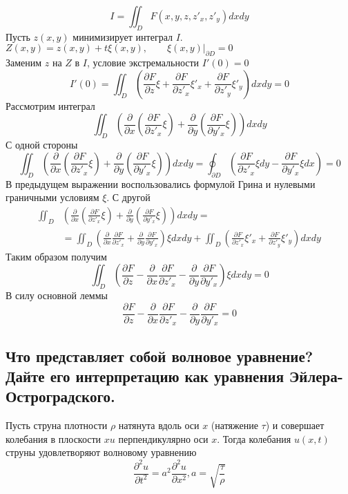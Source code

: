 \documentclass{article}
\begin{document}
\[ I=\iint_D F(x, y, z, z'_x, z'_y)dxdy \]
Пусть $ z(x,y) $ минимизирует интеграл $ I $.\\
$ Z(x,y)=z(x,y) + t\xi(x,y), \qquad \left. \xi(x,y) \right| _{\partial D} = 0 $\\
Заменим $ z $ на $ Z $ в $ I $, условие экстремальности $ I'(0)=0 $
\[ I'(0)=\iint_D\left(\frac{\partial F}{\partial z}\xi + \frac{\partial F}{\partial z'_x}\xi'_x+\frac{\partial F}{\partial z'_y}\xi'_y\right)dxdy=0 \]
Рассмотрим интеграл 
\[ \iint_{D}\left ( \frac{\partial }{\partial x} \left ( \frac{\partial F}{\partial z'_x}\xi \right )+\frac{\partial }{\partial y} \left ( \frac{\partial F}{\partial y'_x}\xi \right )\right )dxdy \]
С одной стороны \[ \iint_{D}\left ( \frac{\partial }{\partial x} \left ( \frac{\partial F}{\partial z'_x}\xi \right )+\frac{\partial }{\partial y} \left ( \frac{\partial F}{\partial y'_x}\xi \right )\right )dxdy=
\oint _{\partial D} \left ( \frac{\partial F}{\partial z'_x}\xi dy- \frac{\partial F}{\partial y'_x}\xi dx \right )=0 \]
В предыдущем выражении воспользовались формулой Грина и нулевыми граничными условиям $ \xi $. С другой
\[ \begin{split}
\iint_{D}&\left ( \frac{\partial }{\partial x} \left ( \frac{\partial F}{\partial z'_x}\xi \right )+
\frac{\partial }{\partial y} \left ( \frac{\partial F}{\partial y'_x}\xi \right )\right )dxdy
= \\&=
\iint_{D}\left ( \frac{\partial }{\partial x}\frac{\partial F}{\partial z'_x}+\frac{\partial }{\partial y} \frac{\partial F}{\partial y'_x}\right )\xi dxdy+
\iint_{D}\left (\frac{\partial F}{\partial z'_x}\xi'_x+\frac{\partial F}{\partial z'_y}\xi'_y\right )dxdy 
\end{split}
\]
Таким образом получим 
\[ \iint_{D}\left (\frac{\partial F}{\partial z}- \frac{\partial }{\partial x}\frac{\partial F}{\partial z'_x}-\frac{\partial }{\partial y} \frac{\partial F}{\partial y'_x}\right )\xi dxdy =0 \]
В силу основной леммы 
\[ \frac{\partial F}{\partial z}- \frac{\partial }{\partial x}\frac{\partial F}{\partial z'_x}-\frac{\partial }{\partial y} \frac{\partial F}{\partial y'_x} = 0 \]
\subsection{Что представляет собой волновое уравнение? Дайте его интерпретацию как уравнения Эйлера-Остроградского.}
Пусть струна плотности $\rho$ натянута вдоль оси $x$ (натяжение $\tau$) и совершает колебания в плоскости $xu$ 
перпендикулярно оси $x$. Тогда колебания $u(x,t)$ струны удовлетворяют волновому уравнению
\[ \frac{\partial^2 u}{\partial t^2} = a^2 \frac{\partial^2 u}{\partial x^2}, a=\sqrt{\frac{\tau}{\rho}} \] 
\end{document}
